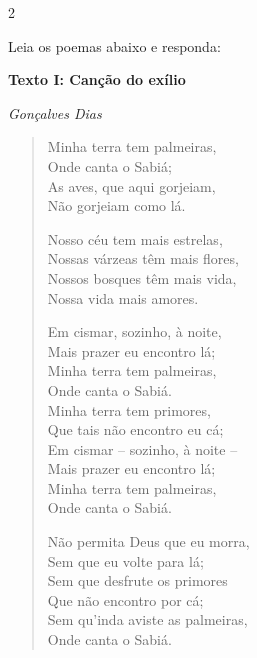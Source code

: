 \num{2}

Leia os poemas abaixo e responda:

\textbf{Texto I: Canção do exílio}

\emph{Gonçalves Dias}

\begin{verse}

Minha terra tem palmeiras, \\

Onde canta o Sabiá; \\

As aves, que aqui gorjeiam, \\

Não gorjeiam como lá. 


Nosso céu tem mais estrelas,\\

Nossas várzeas têm mais flores, \\

Nossos bosques têm mais vida, \\

Nossa vida mais amores.


Em cismar, sozinho, à noite, \\

Mais prazer eu encontro lá; \\

Minha terra tem palmeiras, \\

Onde canta o Sabiá. \\


Minha terra tem primores, \\

Que tais não encontro eu cá; \\

Em cismar -- sozinho, à noite -- \\

Mais prazer eu encontro lá; \\

Minha terra tem palmeiras, \\

Onde canta o Sabiá. 


Não permita Deus que eu morra, \\

Sem que eu volte para lá; \\

Sem que desfrute os primores \\

Que não encontro por cá; \\

Sem qu'inda aviste as palmeiras, \\

Onde canta o Sabiá.

\end{verse}

